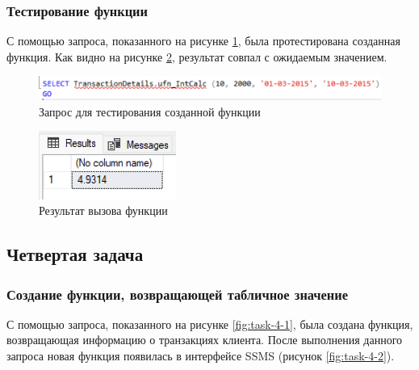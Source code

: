 \documentclass[a4paper, 14pt]{extarticle}
\begin{document}
\subsubsection{Тестирование функции}

С помощью запроса, показанного на рисунке \ref{fig:task-3-3}, была
протестирована созданная функция. Как видно на рисунке \ref{fig:task-3-4},
результат совпал с ожидаемым значением.

\begin{figure}[H]
  \centering
  \includegraphics[width=\textwidth]{images/task-3/3.png}
  \caption{Запрос для тестирования созданной функции}
  \label{fig:task-3-3}
\end{figure}

\begin{figure}[H]
  \centering
  \includegraphics[width=0.4\textwidth]{images/task-3/4.png}
  \caption{Результат вызова функции}
  \label{fig:task-3-4}
\end{figure}

\subsection{Четвертая задача}

\subsubsection{Создание функции, возвращающей табличное значение}

С помощью запроса, показанного на рисунке \ref{fig:task-4-1}, была создана
функция, возвращающая информацию о транзакциях клиента. После выполнения данного
запроса новая функция появилась в интерфейсе SSMS (рисунок \ref{fig:task-4-2}).
\end{document}
